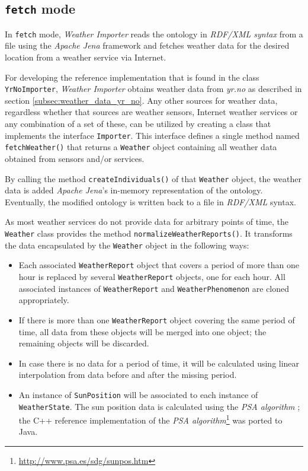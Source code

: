 \subsection{\texttt{fetch} mode}
\label{subsec:importer_fetch}
In \texttt{fetch} mode, \emph{Weather Importer} reads the \thinkhomeweather ontology in \emph{RDF/XML syntax} from a file using the \emph{Apache Jena} framework and fetches weather data for the desired location from a weather service via Internet.

For developing the reference implementation that is found in the class \texttt{YrNoImporter}, \emph{Weather Importer} obtains weather data from \emph{yr.no} as described in section \ref{subsec:weather_data_yr_no}. Any other sources for weather data, regardless whether that sources are weather sensors, Internet weather services or any combination of a set of these, can be utilized by creating a class that implements the interface \texttt{Importer}. This interface defines a single method named \texttt{fetchWeather()} that returns a \texttt{Weather} object containing all weather data obtained from sensors and/or services.

By calling the method \texttt{createIndividuals()} of that \texttt{Weather} object, the weather data is added \emph{Apache Jena}'s in-memory representation of the ontology. Eventually, the modified ontology is written back to a file in \emph{RDF/XML} syntax.

As most weather services do not provide data for arbitrary points of time, the \texttt{Weather} class provides the method \texttt{normalizeWeatherReports()}. It transforms the data encapsulated by the \texttt{Weather} object in the following ways:
\begin{itemize}
  \item Each associated \texttt{WeatherReport} object that covers a period of more than one hour is replaced by several \texttt{WeatherReport} objects, one for each hour. All associated instances of \texttt{WeatherReport} and \texttt{WeatherPhenomenon} are cloned appropriately.
  \item If there is more than one \texttt{WeatherReport} object covering the same period of time, all data from these objects will be merged into one object; the remaining objects will be discarded.
  \item In case there is no data for a period of time, it will be calculated using linear interpolation from data before and after the missing period.
  \item An instance of \texttt{SunPosition} will be associated to each instance of \texttt{WeatherState}. The sun position data is calculated using the \emph{PSA algorithm} \cite{PSA_algorithm}; the C++ reference implementation of the \emph{PSA algorithm}\footnote{\href{http://www.psa.es/sdg/sunpos.htm}{http://www.psa.es/sdg/sunpos.htm}} was ported to Java.
\end{itemize}

